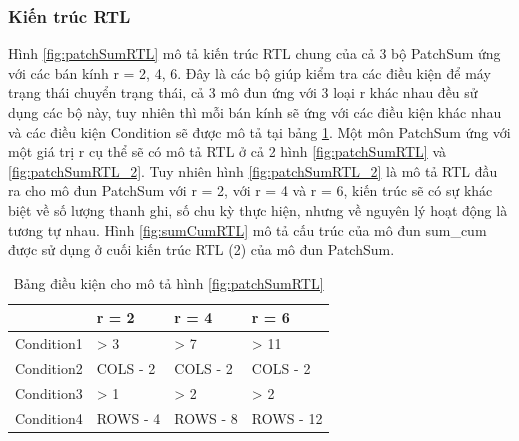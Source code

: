 \subsubsection{Kiến trúc RTL}
Hình \ref{fig:patchSumRTL} mô tả kiến trúc RTL chung của cả 3 bộ PatchSum ứng với các bán kính r = 2, 4, 6. Đây là các bộ giúp kiểm tra các điều kiện để máy trạng thái chuyển trạng thái, cả 3 mô đun ứng với 3 loại r khác nhau đều sử dụng các bộ này, tuy nhiên thì mỗi bán kính sẽ ứng với các điều kiện khác nhau và các điều kiện Condition sẽ được mô tả tại bảng \ref{tab:conditionRTLPatchSum}. Một môn PatchSum ứng với một giá trị r cụ thể sẽ có mô tả RTL ở cả 2 hình \ref{fig:patchSumRTL} và \ref{fig:patchSumRTL_2}. Tuy nhiên hình \ref{fig:patchSumRTL_2} là mô tả RTL đầu ra cho mô đun PatchSum với r = 2, với r = 4 và r = 6, kiến trúc sẽ có sự khác biệt về số lượng thanh ghi, số chu kỳ thực hiện, nhưng về nguyên lý hoạt động là tương tự nhau. Hình \ref{fig:sumCumRTL} mô tả cấu trúc của mô đun sum\_cum được sử dụng ở cuối kiến trúc RTL (2) của mô đun PatchSum.
\begin{table}[H]
	\centering
	\begin{tabular}{|>{\centering\arraybackslash}m{5cm}|>{\centering\arraybackslash}m{3cm}|>{\centering\arraybackslash}m{3cm}|>{\centering\arraybackslash}m{3cm}|}
		\hline
		\rowcolor{gray!30}
		\diagbox[width=5cm,height=1.5cm,dir=NE]{\textbf{Loại điều kiện}}{\textbf{Bán kính}} & \textbf{r = 2}  & \textbf{r = 4} & \textbf{r = 6} \\
		\hline
		Condition1 & > 3 & > 7 & > 11 \\
		\hline
		Condition2 & COLS - 2 & COLS - 2 & COLS - 2 \\
		\hline
		Condition3 & > 1 & > 2 & > 2 \\
		\hline
		Condition4 & ROWS - 4 & ROWS - 8 & ROWS - 12 \\
		\hline
	\end{tabular}
	\caption{Bảng điều kiện cho mô tả hình \ref{fig:patchSumRTL}}
	\label{tab:conditionRTLPatchSum}
\end{table}

